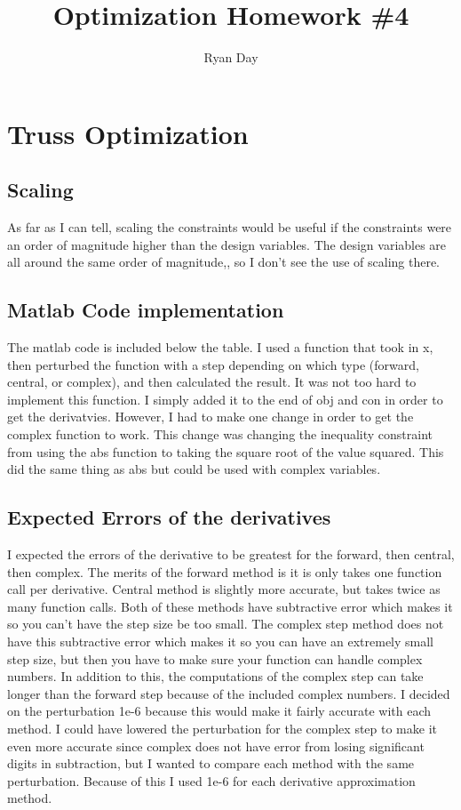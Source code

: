 \documentclass[a4paper]{article}
\author{Ryan Day}
\title{Optimization Homework \#4}
\begin{document}
    \maketitle
    \section{Truss Optimization}

    \subsection{Scaling}
    As far as I can tell, scaling the constraints would be useful if the constraints were an order of magnitude higher than the design variables.
    The design variables are all around the same order of magnitude,, so I don't see the use of scaling there.
    
    \subsection{Matlab Code implementation}
    The matlab code is included below the table. 
    I used a function that took in x, then perturbed the function with a step depending on which type (forward, central, or complex), and then calculated the result.
    It was not too hard to implement this function. 
    I simply added it to the end of obj and con in order to get the derivatvies.
    However, I had to make one change in order to get the complex function to work.
    This change was changing the inequality constraint from using the abs function to taking the square root of the value squared.
    This did the same thing as abs but could be used with complex variables.
    \subsection{Expected Errors of the derivatives}
    I expected the errors of the derivative to be greatest for the forward, then central, then complex. 
    The merits of the forward method is it is only takes one function call per derivative. 
    Central method is slightly more accurate, but takes twice as many function calls.
    Both of these methods have subtractive error which makes it so you can't have the step size be too small.
    The complex step method does not have this subtractive error which makes it so you can have an extremely small step size, but then you have to make sure your function can handle complex numbers.
    In addition to this, the computations of the complex step can take longer than the forward step because of the included complex numbers.
    I decided on the perturbation 1e-6 because this would make it fairly accurate with each method. 
    I could have lowered the perturbation for the complex step to make it even more accurate since complex does not have error from losing significant digits in subtraction, but I wanted to compare each method with the same perturbation.
    Because of this I used 1e-6 for each derivative approximation method. 
    
\end{document}
